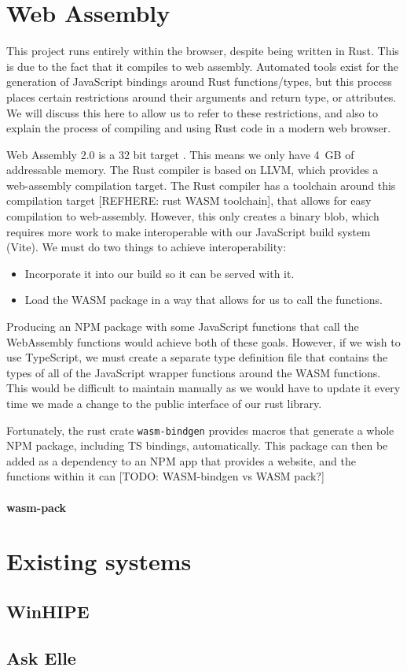 \section{Web Assembly} \label{bg:wasm}
This project runs entirely within the browser, despite being written in Rust. This is due to the fact that it compiles to web assembly. Automated tools exist for the generation of JavaScript bindings around Rust functions/types, but this process places certain restrictions around their arguments and return type, or attributes. We will discuss this here to allow us to refer to these restrictions, and also to explain the process of compiling and using Rust code in a modern web browser. 

Web Assembly 2.0 is a 32 bit target \cite{WebAssemblyCoreSpecification2}. This means we only have 4 GB of addressable memory. The Rust compiler is based on LLVM, which provides a web-assembly compilation target. The Rust compiler has a toolchain around this compilation target [REFHERE: rust WASM toolchain], that allows for easy compilation to web-assembly. However, this only creates a binary blob, which requires more work to make interoperable with our JavaScript build system (Vite). We must do two things to achieve interoperability:
\begin{itemize}
    \item Incorporate it into our build so it can be served with it.
    \item Load the WASM package in a way that allows for us to call the functions.
\end{itemize}
Producing an NPM package with some JavaScript functions that call the WebAssembly functions would achieve both of these goals. However, if we wish to use TypeScript, we must create a separate type definition file that contains the types of all of the JavaScript wrapper functions around the WASM functions. This would be difficult to maintain manually as we would have to update it every time we made a change to the public interface of our rust library. 

Fortunately, the rust crate \verb|wasm-bindgen| provides macros that generate a whole NPM package, including TS bindings, automatically. This package can then be added as a dependency to an NPM app that provides a website, and the functions within it can [TODO: WASM-bindgen vs WASM pack?]

\paragraph{wasm-pack}
\label{bg:wasm-pack}

\section{Existing systems}
\subsection{WinHIPE}

\subsection{Ask Elle}

